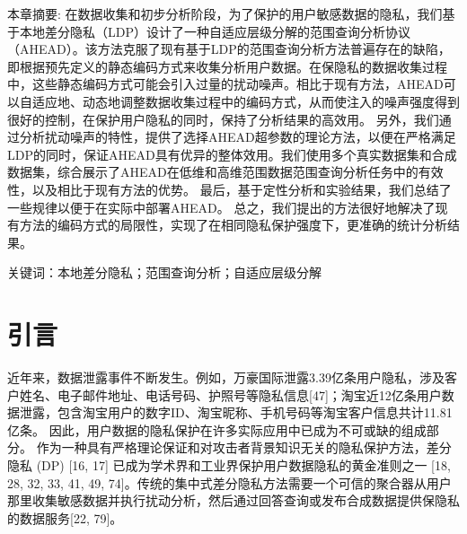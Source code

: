 本章摘要: 
在数据收集和初步分析阶段，为了保护的用户敏感数据的隐私，我们基于本地差分隐私（LDP）设计了一种自适应层级分解的范围查询分析协议（AHEAD）。该方法克服了现有基于LDP的范围查询分析方法普遍存在的缺陷，即根据预先定义的静态编码方式来收集分析用户数据。在保隐私的数据收集过程中，这些静态编码方式可能会引入过量的扰动噪声。相比于现有方法，AHEAD可以自适应地、动态地调整数据收集过程中的编码方式，从而使注入的噪声强度得到很好的控制，在保护用户隐私的同时，保持了分析结果的高效用。
另外，我们通过分析扰动噪声的特性，提供了选择AHEAD超参数的理论方法，以便在严格满足LDP的同时，保证AHEAD具有优异的整体效用。我们使用多个真实数据集和合成数据集，综合展示了AHEAD在低维和高维范围数据范围查询分析任务中的有效性，以及相比于现有方法的优势。
最后，基于定性分析和实验结果，我们总结了一些规律以便于在实际中部署AHEAD。
总之，我们提出的方法很好地解决了现有方法的编码方式的局限性，实现了在相同隐私保护强度下，更准确的统计分析结果。

关键词：本地差分隐私；范围查询分析；自适应层级分解

\section{引言}
近年来，数据泄露事件不断发生。例如，万豪国际泄露3.39亿条用户隐私，涉及客户姓名、电子邮件地址、电话号码、护照号等隐私信息[47]；淘宝近12亿条用户数据泄露，包含淘宝用户的数字ID、淘宝昵称、手机号码等淘宝客户信息共计11.81亿条。 
因此，用户数据的隐私保护在许多实际应用中已成为不可或缺的组成部分。
作为一种具有严格理论保证和对攻击者背景知识无关的隐私保护方法，差分隐私 (DP) [16, 17] 已成为学术界和工业界保护用户数据隐私的黄金准则之一 [18, 28, 32, 33, 41, 49, 74]。传统的集中式差分隐私方法需要一个可信的聚合器从用户那里收集敏感数据并执行扰动分析，然后通过回答查询或发布合成数据提供保隐私的数据服务[22, 79]。

